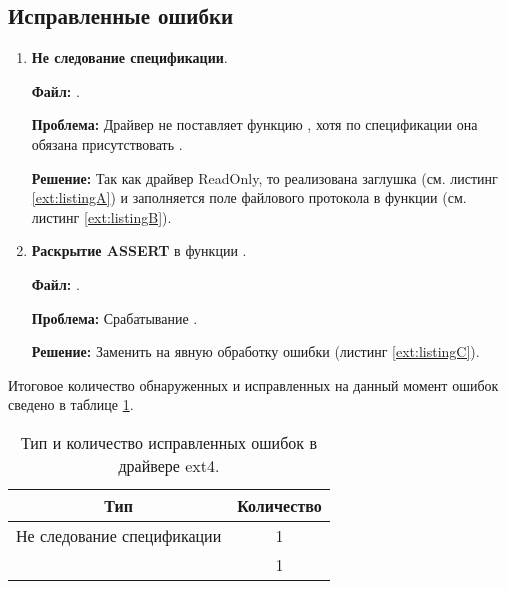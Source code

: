 \subsection{Исправленные ошибки}
\begin{enumerate}
	\item \textbf{Не следование спецификации}.
	
	\textbf{Файл:} .
	
	\textbf{Проблема:} Драйвер не поставляет функцию , хотя по спецификации она обязана присутствовать \cite{UEFISpec}.
	
	\textbf{Решение:} Так как драйвер ReadOnly, то реализована заглушка   (см. листинг \ref{ext:listingA}) и заполняется поле  файлового протокола в функции  (см. листинг \ref{ext:listingB}).
	 
	 
	
	\item \textbf{Раскрытие ASSERT} в функции .
	
	\textbf{Файл:} .
	
	\textbf{Проблема:} Срабатывание .
	
	\textbf{Решение:} Заменить  на явную обработку ошибки (листинг \ref{ext:listingC}).
	  
\end{enumerate}

Итоговое количество обнаруженных и исправленных на данный момент ошибок сведено в таблице \ref{ext:tab:sumerror}.
\begin{table}[htbp]
	\renewcommand{\arraystretch}{1.5}
	\centering
	\begin{tabular}{|c|c|}
		\hline
		\textbf{Тип} & \textbf{Количество} \\
		\hline
		Не следование спецификации & 1 \\
		\hline
		\ErrorName{Assert} & 1 \\
		\hline
	\end{tabular}
	\caption{Тип и количество исправленных ошибок в драйвере ext4.}
	\label{ext:tab:sumerror}
\end{table}

